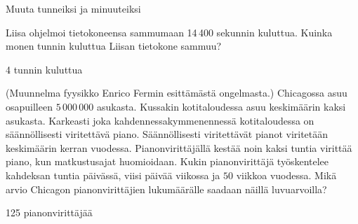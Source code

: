 \begin{tehtavasivu}
\begin{tehtava}
Muuta tunneiksi ja minuuteiksi
\begin{vastaus}
\end{vastaus}
\end{tehtava}

\begin{tehtava}
Liisa ohjelmoi tietokoneensa sammumaan 14\,400 sekunnin kuluttua. Kuinka monen tunnin kuluttua Liisan tietokone sammuu?
\begin{vastaus}
4 tunnin kuluttua
\end{vastaus}
\end{tehtava}

\begin{tehtava}
(Muunnelma fyysikko Enrico Fermin esittämästä ongelmasta.) Chicagossa asuu osapuilleen
$5\,000\,000$ asukasta. Kussakin kotitaloudessa asuu keskimäärin kaksi asukasta.
Karkeasti joka kahdennessakymmenennessä kotitaloudessa on säännöllisesti viritettävä piano.
Säännöllisesti viritettävät pianot viritetään keskimäärin kerran vuodessa.
Pianonvirittäjällä kestää noin kaksi tuntia virittää piano, kun matkustusajat huomioidaan.
Kukin pianonvirittäjä työskentelee kahdeksan tuntia päivässä, viisi päivää viikossa
ja $50$ viikkoa vuodessa. Mikä arvio Chicagon pianonvirittäjien lukumäärälle saadaan näillä
luvuarvoilla?
\begin{vastaus}
125 pianonvirittäjää
\end{vastaus}
\end{tehtava}

\end{tehtavasivu}

